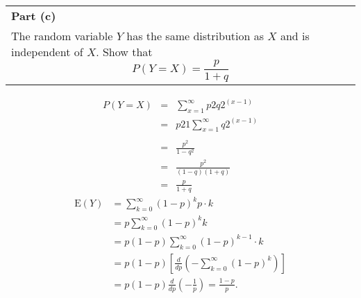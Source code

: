 \documentclass[a4paper,12pt]{article}
\begin{document}
\begin{enumerate}
\begin{itemize}
\end{itemize}

\begin{table}[ht!]
     \centering
     \begin{tabular}{|p{15cm}|}
     \hline        
 \noindent \textbf{Part (c)}\\
\noindent The random variable $Y$ has the same distribution as $X$ and is independent of $X$. Show that
\[P(Y = X) =  \frac{p}{1+q}\]


\\ \hline
 \end{tabular}
\end{table}

\begin{eqnarray*}
P(Y=X)  
&=&
\sum_{x=1}^{\infty }
p2q2^{(x- 1)} \\&=& p2
1 \sum_{x=1}^{\infty }
q2^{(x- 1)} \\
\\ &=& \frac{p^2}{1 -  q^2} 
\\ &=& \frac{p^2}{(1- q)(1+q)} \\ &=& \frac{p}{1+q}
\end{eqnarray*}
\newpage
\[{\displaystyle {\begin{aligned}\mathrm {E} (Y)&{}=\sum _{k=0}^{\infty }(1-p)^{k}p\cdot k\\&{}=p\sum _{k=0}^{\infty }(1-p)^{k}k\\&{}=p(1-p)\sum _{k=0}^{\infty }(1-p)^{k-1}\cdot k\\&{}=p(1-p)\left[{\frac {d}{dp}}\left(-\sum _{k=0}^{\infty }(1-p)^{k}\right)\right]\\&{}=p(1-p){\frac {d}{dp}}\left(-{\frac {1}{p}}\right)={\frac {1-p}{p}}.\end{aligned}}} 
\]
\end{enumerate}
\end{document}
